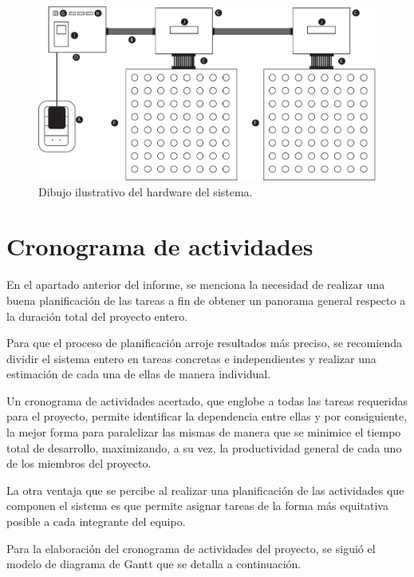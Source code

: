 	\begin{figure}[ht!]
		\begin{center}
			\centering
			\includegraphics[width=1.1\linewidth]{imagenes/dibujo-fisico.pdf}
			\caption{Dibujo ilustrativo del hardware del sistema.}
			\label{fig:dibujo-real}
		\end{center}
	\end{figure}

	
\section{Cronograma de actividades}

En el apartado anterior del informe, se menciona la necesidad de realizar una buena planificación de las tareas a fin de obtener un panorama general respecto a la duración total del proyecto entero.

Para que el proceso de planificación arroje resultados más preciso, se recomienda dividir el sistema entero en tareas concretas e independientes y realizar una estimación de cada una de ellas de manera individual.

Un cronograma de actividades acertado, que englobe a todas las tareas requeridas para el proyecto, permite identificar la dependencia entre ellas y por consiguiente, la mejor forma para paralelizar las mismas de manera que se minimice el tiempo total de desarrollo, maximizando, a su vez, la productividad general de cada uno de los miembros del proyecto.

La otra ventaja que se percibe al realizar una planificación de las actividades que componen el sistema es que permite asignar tareas de la forma más equitativa posible a cada integrante del equipo.

Para la elaboración del cronograma de actividades del proyecto, se siguió el modelo de diagrama de Gantt que se detalla a continuación.

